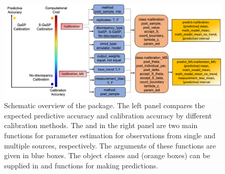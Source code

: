  \begin{figure}[t]
\centering

	\includegraphics[height=.5\textwidth,width=.98\textwidth]{figures/schematic_graph.png}

   \caption{Schematic overview of the 
 package. The left panel compares the expected predictive accuracy and calibration accuracy by different calibration methods.
 The   and  in the right panel are two main functions for parameter estimation for observations from single and multiple sources, respectively. The arguments of these functions are given in blue boxes. The object classes   and  (orange boxes) can be supplied in   and  functions for making predictions.   
 }

 \label{fig:schematic_graph}

\end{figure}





